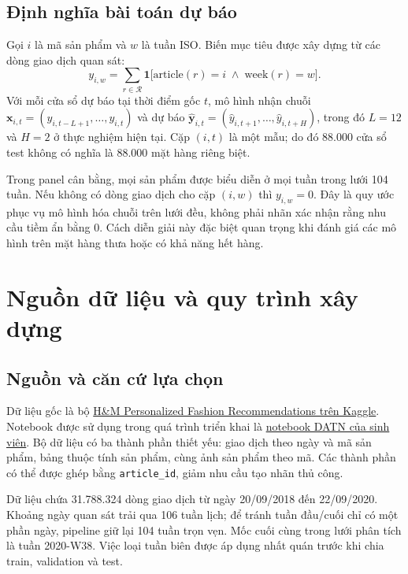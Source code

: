 \documentclass[12pt,a4paper,oneside]{article}
\begin{document}
\subsection{Định nghĩa bài toán dự báo}
Gọi $i$ là mã sản phẩm và $w$ là tuần ISO. Biến mục tiêu được xây dựng từ các dòng giao dịch quan sát:
\begin{equation}
 y_{i,w}=\sum_{r\in\mathcal{R}}\mathbf{1}\bigl[\mathrm{article}(r)=i\;\land\;\mathrm{week}(r)=w\bigr].
 \label{eq:weekly-sales}
\end{equation}
Với mỗi cửa sổ dự báo tại thời điểm gốc $t$, mô hình nhận chuỗi
$\mathbf{x}_{i,t}=(y_{i,t-L+1},\ldots,y_{i,t})$ và dự báo
$\hat{\mathbf{y}}_{i,t}=(\hat y_{i,t+1},\ldots,\hat y_{i,t+H})$, trong đó $L=12$ và $H=2$ ở thực nghiệm hiện tại. Cặp $(i,t)$ là một mẫu; do đó 88.000 cửa sổ test không có nghĩa là 88.000 mặt hàng riêng biệt.

Trong panel cân bằng, mọi sản phẩm được biểu diễn ở mọi tuần trong lưới 104 tuần. Nếu không có dòng giao dịch cho cặp $(i,w)$ thì $y_{i,w}=0$. Đây là quy ước phục vụ mô hình hóa chuỗi trên lưới đều, không phải nhãn xác nhận rằng nhu cầu tiềm ẩn bằng 0. Cách diễn giải này đặc biệt quan trọng khi đánh giá các mô hình trên mặt hàng thưa hoặc có khả năng hết hàng.

\section{Nguồn dữ liệu và quy trình xây dựng}
\subsection{Nguồn và căn cứ lựa chọn}
Dữ liệu gốc là bộ \href{https://www.kaggle.com/competitions/h-and-m-personalized-fashion-recommendations}{H\&M Personalized Fashion Recommendations trên Kaggle}. Notebook được sử dụng trong quá trình triển khai là \href{https://www.kaggle.com/code/alexnguyen147/datn-notebook}{notebook DATN của sinh viên}. Bộ dữ liệu có ba thành phần thiết yếu: giao dịch theo ngày và mã sản phẩm, bảng thuộc tính sản phẩm, cùng ảnh sản phẩm theo mã. Các thành phần có thể được ghép bằng \texttt{article\_id}, giảm nhu cầu tạo nhãn thủ công.

Dữ liệu chứa 31.788.324 dòng giao dịch từ ngày 20/09/2018 đến 22/09/2020. Khoảng ngày quan sát trải qua 106 tuần lịch; để tránh tuần đầu/cuối chỉ có một phần ngày, pipeline giữ lại 104 tuần trọn vẹn. Mốc cuối cùng trong lưới phân tích là tuần 2020-W38. Việc loại tuần biên được áp dụng nhất quán trước khi chia train, validation và test.
\end{document}
